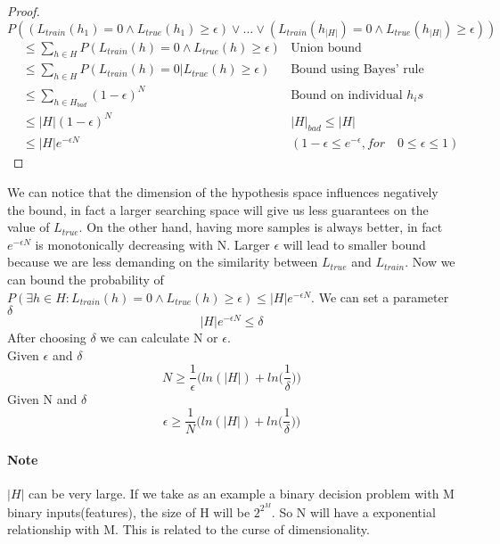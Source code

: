 \documentclass[../main.tex]{subfiles}
\begin{document}
\newpage
\begin{proof}
    $$P((L_{train}(h_1)=0 \land L_{true}(h_1) \geq \epsilon) \lor \dots \lor (L_{train}(h_{|H|})=0 \land L_{true}(h_{|H|}) \geq \epsilon))$$
    \begin{align*}
         & \leq \sum_{h \in H} P(L_{train}(h)=0 \land L_{true}(h) \geq \epsilon) & \text{Union bound}                                               \\
         & \leq \sum_{h \in H} P(L_{train}(h)=0 | L_{true}(h) \geq \epsilon)     & \text{Bound using Bayes’ rule}                                   \\
         & \leq \sum_{h \in H_{bad}} (1-\epsilon)^N                               & \text{Bound on individual }h_is                                  \\
         & \leq |H|(1-\epsilon)^N                                                 & |H|_{bad}\leq|H|                                                 \\
         & \leq |H|e^{-\epsilon N}                                                & (1-\epsilon \leq e^{-\epsilon},for \quad 0 \leq \epsilon \leq 1)
    \end{align*}
\end{proof}
We can notice that the dimension of the hypothesis space influences negatively the bound, in fact a larger searching space will give us less guarantees on the value of $L_{true}$. On the other hand, having more samples is always better, in fact $e^{-\epsilon N}$ is monotonically decreasing with N. Larger $\epsilon$ will lead to smaller bound because we are less demanding on the similarity between $L_{true}$ and $L_{train}$.
Now we can bound the probability of $P(\exists h \in H: L_{train}(h)=0 \land L_{true}(h) \geq \epsilon) \leq |H|e^{-\epsilon N}$. We can set a parameter $\delta$
\begin{equation*}
    |H|e^{-\epsilon N} \leq \delta
\end{equation*}
After choosing $\delta$ we can calculate N or $\epsilon$.\\
Given $\epsilon$ and $\delta$
\begin{equation}
    N \geq \frac{1}{\epsilon} \bigg( ln(|H|) + ln \bigg( \frac{1}{\delta} \bigg) \bigg)
\end{equation}
Given N and $\delta$
\begin{equation}
    \epsilon \geq \frac{1}{N} \bigg( ln(|H|) + ln \bigg( \frac{1}{\delta} \bigg) \bigg)
\end{equation}
\paragraph{Note} $|H|$ can be very large. If we take as an example a binary decision problem with M binary inputs(features), the size of H will be $2^{2^M}$. So N will have a exponential relationship with M. This is related to the curse of dimensionality.
\end{document}
